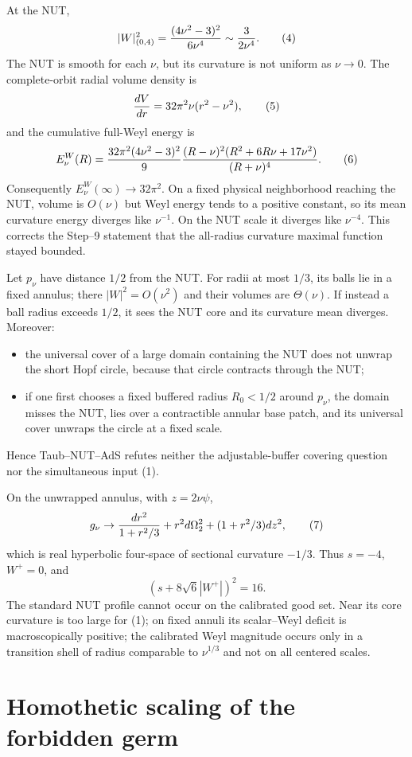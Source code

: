 At the NUT,
\[
 |W|_{(0,4)}^2={ (4\nu^2-3)^2\over6\nu^4}
 \sim{3\over2\nu^4}.                                          \tag{4}
\]
The NUT is smooth for each $\nu$, but its curvature is not uniform as
$\nu\to0$.  The complete-orbit radial volume density is
\[
 {dV\over dr}=32\pi^2\nu(r^2-\nu^2),                            \tag{5}
\]
and the cumulative full-Weyl energy is
\[
 E_\nu^W(R)={32\pi^2(4\nu^2-3)^2\over9}
 { (R-\nu)^2(R^2+6R\nu+17\nu^2)\over(R+\nu)^4}.                 \tag{6}
\]
Consequently $E_\nu^W(\infty)\to32\pi^2$.  On a fixed physical
neighborhood reaching the NUT, volume is $O(\nu)$ but Weyl energy tends to a
positive constant, so its mean curvature energy diverges like $\nu^{-1}$.
On the NUT scale it diverges like $\nu^{-4}$.  This corrects the Step--9
statement that the all-radius curvature maximal function stayed bounded.

Let $p_\nu$ have distance $1/2$ from the NUT.  For radii at most $1/3$, its
balls lie in a fixed annulus; there $|W|^2=O(\nu^2)$ and their volumes are
$\Theta(\nu)$.  If instead a ball radius exceeds $1/2$, it sees the NUT core
and its curvature mean diverges.  Moreover:
\begin{itemize}
\item the universal cover of a large domain containing the NUT does not
unwrap the short Hopf circle, because that circle contracts through the NUT;
\item if one first chooses a fixed buffered radius $R_0<1/2$ around $p_\nu$,
the domain misses the NUT, lies over a contractible annular base patch, and
its universal cover unwraps the circle at a fixed scale.
\end{itemize}
Hence Taub--NUT--AdS refutes neither the adjustable-buffer covering question
nor the simultaneous input (1).

On the unwrapped annulus, with $z=2\nu\psi$,
\[
 g_\nu\to {dr^2\over1+r^2/3}+r^2d\Omega_2^2+(1+r^2/3)dz^2,
                                                                    \tag{7}
\]
which is real hyperbolic four-space of sectional curvature $-1/3$.  Thus
$s=-4$, $W^+=0$, and
\[
 (s+8\sqrt6|W^+|)^2=16.                                       \tag{8}
\]
The standard NUT profile cannot occur on the calibrated good set.  Near its
core curvature is too large for (1); on fixed annuli its scalar--Weyl deficit
is macroscopically positive; the calibrated Weyl magnitude occurs only in a
transition shell of radius comparable to $\nu^{1/3}$ and not on all centered
scales.

\section{Homothetic scaling of the forbidden germ}

